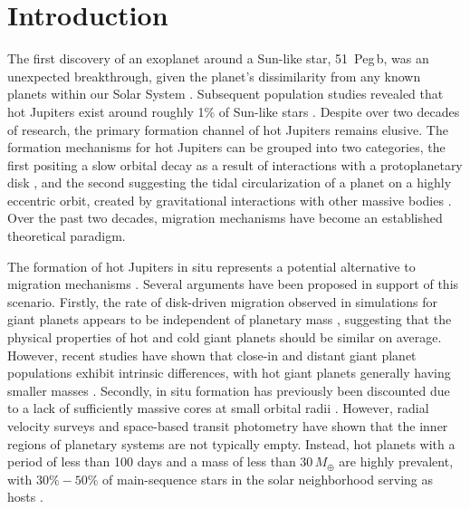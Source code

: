\documentclass[traditabstract,longauth]{aa}
\begin{document}
\section{Introduction}\label{sec:introduction}

The first discovery of an exoplanet around a Sun-like star, 51~Peg\,b, was an unexpected breakthrough, given the planet's dissimilarity from any known planets within our Solar System \citep{Mayor95}. Subsequent population studies revealed that hot Jupiters exist around roughly 1\% of Sun-like stars \citep{Mayor11, Wright12}. Despite over two decades of research, the primary formation channel of hot Jupiters remains elusive. The formation mechanisms for hot Jupiters can be grouped into two categories, the first positing a slow orbital decay as a result of interactions with a protoplanetary disk \citep[e.g.,][]{Lin96, Ward97, Murray98}, and the second suggesting the tidal circularization of a planet on a highly eccentric orbit, created by gravitational interactions with other massive bodies \citep[e.g.,][]{Rasio96, Fabrycky07, Naoz11}. Over the past two decades, migration mechanisms have become an established theoretical paradigm.

The formation of hot Jupiters in situ represents a potential alternative to migration mechanisms \citep[e.g.,][]{Pollack96,Boss97,Batygin16,Hasegawa19,Poon21}. Several arguments have been proposed in support of this scenario. Firstly, the rate of disk-driven migration observed in simulations for giant planets appears to be independent of planetary mass \citep{Kley12}, suggesting that the physical properties of hot and cold giant planets should be similar on average. However, recent studies have shown that close-in and distant giant planet populations exhibit intrinsic differences, with hot giant planets generally having smaller masses \citep{Knutson14,Bryan16}. Secondly, in situ formation has previously been discounted due to a lack of sufficiently massive cores at small orbital radii \citep{Rafikov06}. However, radial velocity surveys and space-based transit photometry have shown that the inner regions of planetary systems are not typically empty. Instead, hot planets with a period of less than 100 days and a mass of less than $30\,M_{\oplus}$ are highly prevalent, with $30\%-50\%$ of main-sequence stars in the solar neighborhood serving as hosts \citep[e.g.,][]{Dressing13,Petigura13,Winn15}.
\end{document}
